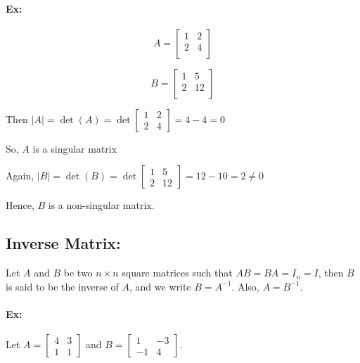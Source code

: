 \documentclass{article}
\begin{document}
    \paragraph{Ex:}
    \begin{minipage}{0.4\textwidth}
    \[ A = 
    \begin{bmatrix}
    1 & 2 \\
    2 & 4 \\
    \end{bmatrix} \]
    \end{minipage}
    \begin{minipage}{0.1\textwidth}
    \end{minipage} 
    \begin{minipage}{0.4\textwidth}
    \[ B = 
    \begin{bmatrix}
    1 & 5 \\
    2 & 12 \\
    \end{bmatrix} \]
    \end{minipage}

    \vspace{20pt}    
    Then \(|A| = \det(A) = \det \begin{bmatrix} 1 & 2 \\ 2 & 4 \end{bmatrix} = 4 - 4 = 0\)
    
    So, \(A\) is a singular matrix
    
    \vspace{20pt}
    Again, \(|B| = \det(B) = \det \begin{bmatrix} 1 & 5 \\ 2 & 12 \end{bmatrix} = 12 - 10 = 2 \neq 0\)
    
    Hence, \( B \) is a non-singular matrix.
\vspace{20pt}
\subsection*{Inverse Matrix:}
\vspace{10pt}
    Let \( A \) and \( B \) be two \(n \times n\) square matrices such that \( AB = BA = I_{n} = I \), then \( B \) is said to be the inverse of \( A \), and we write \( B = A^{-1} \). Also, \( A = B^{-1} \).
    \vspace{20pt}
    \paragraph{Ex:}
    Let \( A = \begin{bmatrix} 4 & 3 \\ 1 & 1 \end{bmatrix} \) and \( B = \begin{bmatrix} 1 & -3 \\ -1 & 4 \end{bmatrix} \).
    
\end{document}

